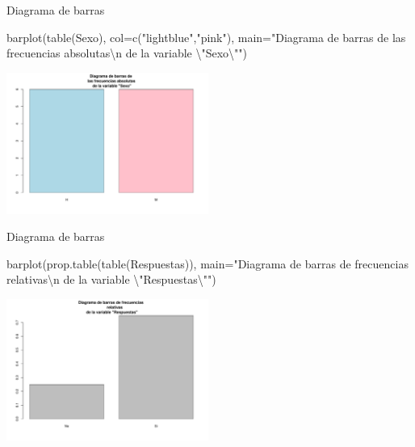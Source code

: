 \documentclass[
  ignorenonframetext,
  aspectratio=169]{beamer}
\newenvironment{Shaded}{\begin{snugshade}}{\end{snugshade}}
\newcommand{\AttributeTok}[1]{\textcolor[rgb]{0.77,0.63,0.00}{#1}}
\newcommand{\FunctionTok}[1]{\textcolor[rgb]{0.00,0.00,0.00}{#1}}
\newcommand{\NormalTok}[1]{#1}
\newcommand{\SpecialCharTok}[1]{\textcolor[rgb]{0.00,0.00,0.00}{#1}}
\newcommand{\StringTok}[1]{\textcolor[rgb]{0.31,0.60,0.02}{#1}}
\begin{document}
\begin{frame}[fragile]{Diagrama de barras}
\protect\hypertarget{diagrama-de-barras-1}{}
\begin{Shaded}
\begin{Highlighting}[]
\FunctionTok{barplot}\NormalTok{(}\FunctionTok{table}\NormalTok{(Sexo), }\AttributeTok{col=}\FunctionTok{c}\NormalTok{(}\StringTok{"lightblue"}\NormalTok{,}\StringTok{"pink"}\NormalTok{), }
\AttributeTok{main=}\StringTok{"Diagrama de barras de }
\StringTok{las frecuencias absolutas}\SpecialCharTok{\textbackslash{}n}\StringTok{ de la variable }\SpecialCharTok{\textbackslash{}"}\StringTok{Sexo}\SpecialCharTok{\textbackslash{}"}\StringTok{"}\NormalTok{)}
\end{Highlighting}
\end{Shaded}

\begin{center}\includegraphics[width=250px]{Hora3_files/figure-beamer/unnamed-chunk-32-1} \end{center}
\end{frame}

\begin{frame}[fragile]{Diagrama de barras}
\protect\hypertarget{diagrama-de-barras-2}{}
\begin{Shaded}
\begin{Highlighting}[]
\FunctionTok{barplot}\NormalTok{(}\FunctionTok{prop.table}\NormalTok{(}\FunctionTok{table}\NormalTok{(Respuestas)), }
\AttributeTok{main=}\StringTok{"Diagrama de barras de frecuencias }
\StringTok{      relativas}\SpecialCharTok{\textbackslash{}n}\StringTok{ de la variable }\SpecialCharTok{\textbackslash{}"}\StringTok{Respuestas}\SpecialCharTok{\textbackslash{}"}\StringTok{"}\NormalTok{)}
\end{Highlighting}
\end{Shaded}

\begin{center}\includegraphics[width=250px]{Hora3_files/figure-beamer/unnamed-chunk-33-1} \end{center}
\end{frame}
\end{document}
